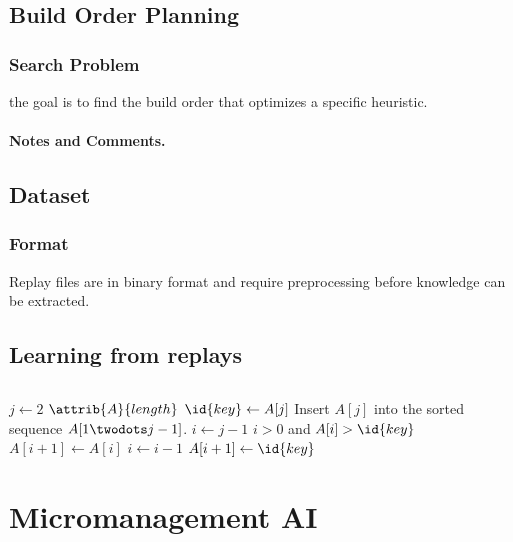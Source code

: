 \documentclass[sigconf]{acmart}
\begin{document}
\subsection{Build Order Planning}
\subsubsection{Search Problem}
the goal is to find the build order that optimizes a specific heuristic.
\paragraph{Notes and Comments.}
\subsection{Dataset}
\subsubsection{Format}
Replay files are in binary format and require preprocessing before knowledge can be extracted.
\subsection{Learning from replays}

\subsection{}

\begin{codebox}
\li \For $j \gets 2$ \To $\attrib{A}{length}$
\li \Do
$\id{key} \gets A[j]$
\li \Comment Insert $A[j]$ into the sorted sequence
$A[1 \twodots j-1]$.
\li $i \gets j-1$
\li \While $i > 0$ and $A[i] > \id{key}$
\li \Do
$A[i+1] \gets A[i]$
\li $i \gets i-1$
\End
\li $A[i+1] \gets \id{key}$
\End
\end{codebox}

\section{Micromanagement AI}
\subsection{}




\end{document}
